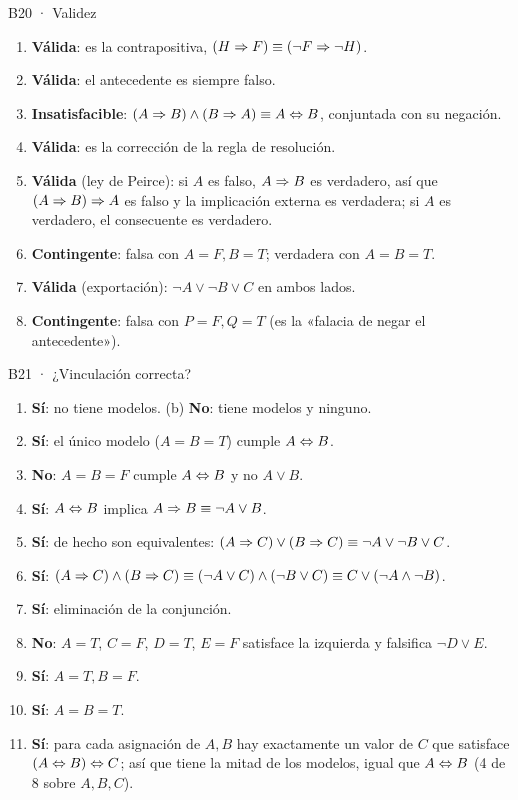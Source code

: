 \begin{solucion}{B20 · Validez}
\begin{enumerate}[label=(\alph*),nosep]
\item \textbf{Válida}: es la contrapositiva, $(H\Rightarrow F)\equiv(\neg F\Rightarrow\neg H)$.
\item \textbf{Válida}: el antecedente es siempre falso.
\item \textbf{Insatisfacible}: $(A\Rightarrow B)\wedge(B\Rightarrow A)\equiv A\Leftrightarrow B$, conjuntada con su negación.
\item \textbf{Válida}: es la corrección de la regla de resolución.
\item \textbf{Válida} (ley de Peirce): si $A$ es falso, $A\Rightarrow B$ es verdadero, así que $(A\Rightarrow B)\Rightarrow A$ es falso y la implicación externa es verdadera; si $A$ es verdadero, el consecuente es verdadero.
\item \textbf{Contingente}: falsa con $A=F,B=T$; verdadera con $A=B=T$.
\item \textbf{Válida} (exportación): $\neg A\vee\neg B\vee C$ en ambos lados.
\item \textbf{Contingente}: falsa con $P=F,Q=T$ (es la «falacia de negar el antecedente»).
\end{enumerate}
\end{solucion}

\begin{solucion}{B21 · ¿Vinculación correcta?}
\begin{enumerate}[label=(\alph*),nosep]
\item \textbf{Sí}:  no tiene modelos. (b) \textbf{No}:  tiene modelos y  ninguno.
\setcounter{enumi}{2}
\item \textbf{Sí}: el único modelo ($A=B=T$) cumple $A\Leftrightarrow B$.
\item \textbf{No}: $A=B=F$ cumple $A\Leftrightarrow B$ y no $A\vee B$.
\item \textbf{Sí}: $A\Leftrightarrow B$ implica $A\Rightarrow B\equiv\neg A\vee B$.
\item \textbf{Sí}: de hecho son equivalentes: $(A\Rightarrow C)\vee(B\Rightarrow C)\equiv\neg A\vee\neg B\vee C$.
\item \textbf{Sí}: $(A\Rightarrow C)\wedge(B\Rightarrow C)\equiv(\neg A\vee C)\wedge(\neg B\vee C)\equiv C\vee(\neg A\wedge\neg B)$.
\item \textbf{Sí}: eliminación de la conjunción.
\item \textbf{No}: $A=T$, $C=F$, $D=T$, $E=F$ satisface la izquierda y falsifica $\neg D\vee E$.
\item \textbf{Sí}: $A=T,B=F$.
\item \textbf{Sí}: $A=B=T$.
\item \textbf{Sí}: para cada asignación de $A,B$ hay exactamente un valor de $C$ que satisface $(A\Leftrightarrow B)\Leftrightarrow C$; así que tiene la mitad de los modelos, igual que $A\Leftrightarrow B$ (4 de 8 sobre $A,B,C$).
\end{enumerate}
\end{solucion}

